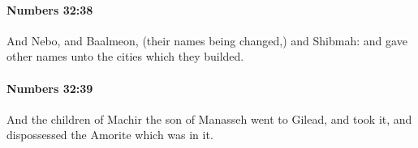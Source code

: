 		\paragraph{Numbers 32:38} %
			\label{NUMBERS-32-38}

			And Nebo, and Baalmeon, (their names being changed,) and Shibmah: and gave other names unto the cities which they builded.


		\paragraph{Numbers 32:39} %
			\label{NUMBERS-32-39}

			And the children of Machir the son of Manasseh went to Gilead, and took it, and dispossessed the Amorite which was in it.


